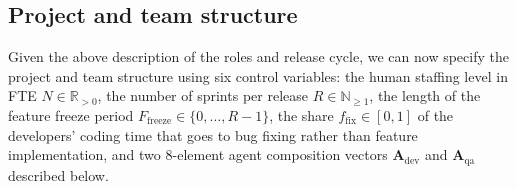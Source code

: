 \documentclass[smallextended]{svjour3}       %
\begin{document}
\subsection{Project and team structure}
\label{sec:model:team}

Given the above description of the roles and release cycle, we can now specify the project and team structure using six control variables: the human staffing level in FTE
$N \in \mathbb{R}_{>0}$, the number of sprints per release $R \in \mathbb{N}_{\geq 1}$, the length of the feature freeze period $F_\mathrm{freeze} \in
\{0, \ldots, R-1\}$, the share $f_\mathrm{fix} \in [0,1]$ of the developers' coding time that goes to bug fixing rather than feature implementation, and two 8-element agent composition vectors $\mathbf{A}_\mathrm{dev}$ and
$\mathbf{A}_\mathrm{qa}$ described below.
\end{document}
